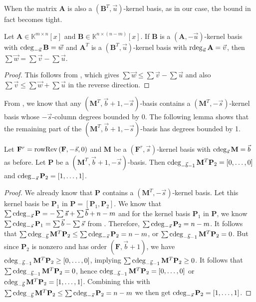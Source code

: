 When the matrix $\mathbf{A}$ is also a $\left(\mathbf{B}^{T},\vec{u}\right)$-kernel
basis, as in our case, the bound in fact becomes tight.
\begin{lem}
\label{lem:mutualMinimalNullspaceBasisDegrees}Let $\mathbf{A}\in\mathbb{K}^{m\times n}[x]$
and $\mathbf{B}\in\mathbb{K}^{n\times(n-m)}\left[x\right]$. If $\mathbf{B}$
is a $(\mathbf{A},-\vec{u})$-kernel basis with $\cdeg_{-\vec{u}}\mathbf{B}=\vec{w}$
and $\mathbf{A}^{T}$ is a $\left(\mathbf{B}^{T},\vec{u}\right)$-kernel
basis with $\rdeg_{\vec{u}}\mathbf{A}=\vec{v}$, then $\sum\vec{w}=\sum\vec{v}-\sum\vec{u}$.\end{lem}
\begin{proof}
This follows from , which
gives $\sum\vec{w}\le\sum\vec{v}-\sum\vec{u}$ and also $\sum\vec{v}\le\sum\vec{w}+\sum\vec{u}$
in the reverse direction.
\end{proof}
From , we know that any
$\left(\mathbf{M}^{T},\vec{b}+1,-\vec{s}\right)$-basis contains a
$\left(\mathbf{M}^{T},-\vec{s}\right)$-kernel basis whose $-\vec{s}$-column
degrees bounded by 0. The following lemma shows that the remaining
part of the $\left(\mathbf{M}^{T},\vec{b}+1,-\vec{s}\right)$-basis
has degrees bounded by 1.
\begin{lem}
\label{lem:nullspaceOrderbasisDegree}Let $\mathbf{F}^{r}=\operatorname{rowRev}\left(\mathbf{F},-\vec{s},0\right)$
and $\mathbf{M}$ be a $(\mathbf{F}^{r},\vec{s})$-kernel basis with
$\cdeg_{\vec{s}}\mathbf{M}=\vec{b}$ as before. Let $\mathbf{P}$
be a $\left(\mathbf{M}^{T},\vec{b}+1,-\vec{s}\right)$-basis. Then
$\cdeg_{-\vec{b}-1}\mathbf{M}^{T}\mathbf{P}_{2}=\left[0,\dots,0\right]$
and $\cdeg_{-\vec{s}}\mathbf{P}_{2}=\left[1,\dots,1\right]$.\end{lem}
\begin{proof}
We already know that $\mathbf{P}$ contains a $\left(\mathbf{M}^{T},-\vec{s}\right)$-kernel
basis. Let this kernel basis be $\mathbf{P}_{1}$ in $\mathbf{P}=\left[\mathbf{P}_{1},\mathbf{P}_{2}\right]$.
We know that $\sum\cdeg_{-\vec{s}}\mathbf{P}=-\sum\vec{s}+\sum\vec{b}+n-m$
and for the kernel basis $\mathbf{P}_{1}$ in $\mathbf{P}$, we know
$\sum\cdeg_{-\vec{s}}\mathbf{P}_{1}=\sum\vec{b}-\sum\vec{s}$ from
. Therefore, $\sum\cdeg_{-\vec{s}}\mathbf{P}_{2}=n-m$.
It follows that $\sum\cdeg_{-\vec{b}}\mathbf{M}^{T}\mathbf{P}_{2}\le\sum\cdeg_{-\vec{s}}\mathbf{P}_{2}=n-m$,
or $\sum\cdeg_{-\vec{b}-1}\mathbf{M}^{T}\mathbf{P}_{2}=0$. But since
$\mathbf{P}_{2}$ is nonzero and has order $\left(\mathbf{F},\vec{b}+1\right)$,
we have $\cdeg_{-\vec{b}-1}\mathbf{M}^{T}\mathbf{P}_{2}\ge\left[0,\dots,0\right]$,
implying $\sum\cdeg_{-\vec{b}-1}\mathbf{M}^{T}\mathbf{P}_{2}\ge0$.
It follows that $\sum\cdeg_{-\vec{b}-1}\mathbf{M}^{T}\mathbf{P}_{2}=0$,
hence $\cdeg_{-\vec{b}-1}\mathbf{M}^{T}\mathbf{P}_{2}=\left[0,\dots,0\right]$
or $\cdeg_{-\vec{b}}\mathbf{M}^{T}\mathbf{P}_{2}=\left[1,\dots,1\right]$.
Combining this with $\sum\cdeg_{-\vec{b}}\mathbf{M}^{T}\mathbf{P}_{2}\le\sum\cdeg_{-\vec{s}}\mathbf{P}_{2}=n-m$
we then get $\cdeg_{-\vec{s}}\mathbf{P}_{2}=\left[1,\dots,1\right]$.
\end{proof}
